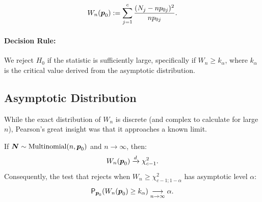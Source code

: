 \[
    W_n(\boldsymbol{p}_0) := \sum\limits_{j=1}^c \frac{(N_j - n p_{0j})^2}{n p_{0j}}.
\]



\paragraph{Decision Rule:}
We reject $H_0$ if the statistic is sufficiently large, specifically if $W_n \ge k_\alpha$, where $k_\alpha$ is the critical value derived from the asymptotic distribution.

\subsection{Asymptotic Distribution}

While the exact distribution of $W_n$ is discrete (and complex to calculate for large $n$), Pearson's great insight was that it approaches a known limit.

\begin{theo}
    If $\boldsymbol{N} \sim \text{Multinomial}(n, \boldsymbol{p}_0)$ and $n \to \infty$, then:
    \[
        W_n(\boldsymbol{p}_0) \xrightarrow{d} \chi_{c-1}^2.
    \]
    Consequently, the test that rejects when $W_n \ge \chi^2_{c-1; 1-\alpha}$ has asymptotic level $\alpha$:
    \[
        \mathsf{P}_{\boldsymbol{p}_0}(W_n(\boldsymbol{p}_0) \ge k_\alpha) \underset{n \to \infty}{\longrightarrow} \alpha.
    \]
\end{theo}

